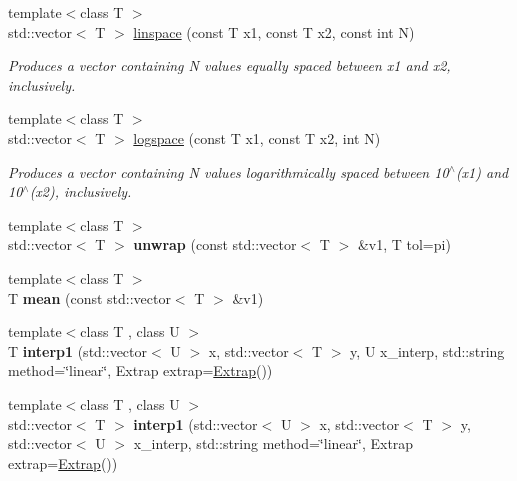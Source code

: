 \begin{DoxyCompactItemize}
\item 
{\footnotesize template$<$class T $>$ }\\std\-::vector$<$ T $>$ \hyperlink{namespacekeycpp_ab57eee495c93eb18ebf8c8ccf4d44e74}{linspace} (const T x1, const T x2, const int N)
\begin{DoxyCompactList}\small\item\em Produces a vector containing N values equally spaced between x1 and x2, inclusively. \end{DoxyCompactList}\item 
{\footnotesize template$<$class T $>$ }\\std\-::vector$<$ T $>$ \hyperlink{namespacekeycpp_ac92462e3b25414144d4e45fc269d2f13}{logspace} (const T x1, const T x2, int N)
\begin{DoxyCompactList}\small\item\em Produces a vector containing N values logarithmically spaced between 10$^\wedge$(x1) and 10$^\wedge$(x2), inclusively. \end{DoxyCompactList}\item 
\hypertarget{namespacekeycpp_a4e350b4b11ea4d9962b4daa13cc66e32}{{\footnotesize template$<$class T $>$ }\\std\-::vector$<$ T $>$ {\bfseries unwrap} (const std\-::vector$<$ T $>$ \&v1, T tol=pi)}\label{namespacekeycpp_a4e350b4b11ea4d9962b4daa13cc66e32}

\item 
\hypertarget{namespacekeycpp_ad1acd03db6a49523cb5dbe751a80917a}{{\footnotesize template$<$class T $>$ }\\T {\bfseries mean} (const std\-::vector$<$ T $>$ \&v1)}\label{namespacekeycpp_ad1acd03db6a49523cb5dbe751a80917a}

\item 
\hypertarget{namespacekeycpp_a123211086c4953fe9346acc22b2a67f9}{{\footnotesize template$<$class T , class U $>$ }\\T {\bfseries interp1} (std\-::vector$<$ U $>$ x, std\-::vector$<$ T $>$ y, U x\-\_\-interp, std\-::string method=\char`\"{}linear\char`\"{}, Extrap extrap=\hyperlink{classkeycpp_1_1_extrap}{Extrap}())}\label{namespacekeycpp_a123211086c4953fe9346acc22b2a67f9}

\item 
\hypertarget{namespacekeycpp_a56633eb0878a0dbe6596fb0e74fdc6ea}{{\footnotesize template$<$class T , class U $>$ }\\std\-::vector$<$ T $>$ {\bfseries interp1} (std\-::vector$<$ U $>$ x, std\-::vector$<$ T $>$ y, std\-::vector$<$ U $>$ x\-\_\-interp, std\-::string method=\char`\"{}linear\char`\"{}, Extrap extrap=\hyperlink{classkeycpp_1_1_extrap}{Extrap}())}\label{namespacekeycpp_a56633eb0878a0dbe6596fb0e74fdc6ea}


\end{DoxyCompactItemize}

